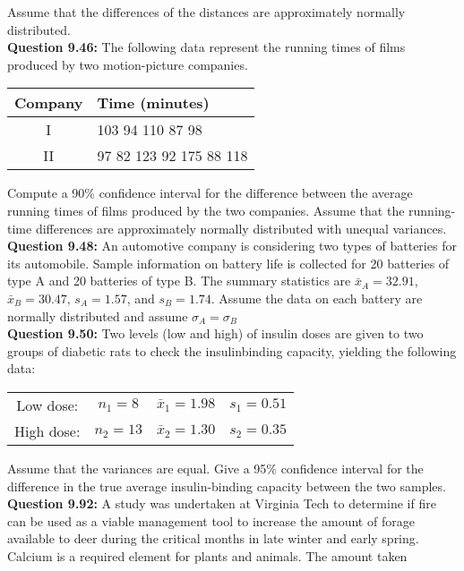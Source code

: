 \documentclass{article}
\begin{document}
Assume that the differences of the distances are 
approximately normally distributed.\\\newline
\textbf{Question 9.46:}
The following data represent the running times
of films produced by two motion-picture companies.
\begin{center}
\begin{tabular}{c | l}
    Company & Time (minutes)\\
    \hline
    I & 103 94 110 87 98 \\
    II & 97 82 123 92 175 88 118
\end{tabular}
\end{center}
Compute a 90\% confidence interval for the difference
between the average running times of films produced by
the two companies. Assume that the running-time 
differences are approximately normally distributed with
unequal variances.\\\newline
\textbf{Question 9.48:}
An automotive company is considering two
types of batteries for its automobile. Sample information 
on battery life is collected for 20 batteries of
type A and 20 batteries of type B. The summary
statistics are $\bar{x}_A = 32.91$, $\bar{x}_B = 30.47$, $s_A = 1.57$,
and $s_B = 1.74$. Assume the data on each battery are
normally distributed and assume $\sigma_A = \sigma_B$\\\newline
\textbf{Question 9.50:}
Two levels (low and high) of insulin doses are
given to two groups of diabetic rats to check the 
insulinbinding capacity, yielding the following data:
\begin{center}
\begin{tabular}{c c c c}
    Low dose: & $n_1 = 8$ & $\bar{x}_1 = 1.98$ & $s_1 = 0.51$ \\
    High dose: & $n_2 = 13$ & $\bar{x}_2 = 1.30$ & $s_2 = 0.35$
\end{tabular}
\end{center}
Assume that the variances are equal. Give a 95\% 
confidence interval for the difference in the true average
insulin-binding capacity between the two samples.\\\newline
\textbf{Question 9.92:}
A study was undertaken at Virginia Tech to determine if 
fire can be used as a viable management tool to increase 
the amount of forage available to deer during the critical 
months in late winter and early spring. Calcium is a 
required element for plants and animals. The amount taken 
\end{document}
